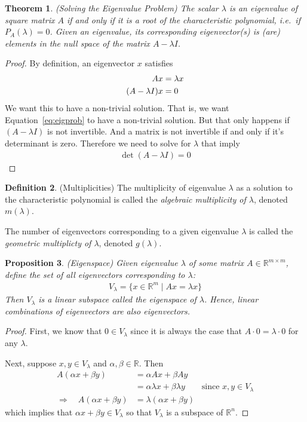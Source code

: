 \documentclass[12pt]{article}
\numberwithin{equation}{section} %
\theoremstyle{plain}
\newtheorem{thm}{Theorem}[section]
\newtheorem{prop}[thm]{Proposition}
\theoremstyle{definition}
\newtheorem{defn}[thm]{Definition}
\theoremstyle{remark}
\newcommand{\R}{\mathbb{R}}
\newcommand{\Rn}{\mathbb{R}^n}
\newcommand{\Rm}{\mathbb{R}^m}
\newcommand{\Rmm}{\mathbb{R}^{m\times m}}
\begin{document}
\begin{thm}\emph{(Solving the Eigenvalue Problem)}
The scalar $\lambda$ is an eigenvalue of square matrix $A$ if and only
if it is a root of the characteristic polynomial, i.e.\ if
$P_A(\lambda)=0$.  Given an eigenvalue, its corresponding eigenvector(s)
is (are) elements in the null space of the matrix $A-\lambda I$.
\end{thm}
\begin{proof}
By definition, an eigenvector $x$ satisfies
\begin{align}
  A x &= \lambda x\notag\\
  (A- \lambda I)x &= 0
  \label{eq:eigprob}
\end{align}
We want this to have a non-trivial solution. That is, we want
Equation~\ref{eq:eigprob} to have a non-trivial solution. But that only
happens if $(A-\lambda I)$ is not invertible. And a matrix is not
invertible if and only if it's determinant is zero. Therefore we need to
solve for $\lambda$ that imply
\begin{align*}
  \det(A-\lambda I)=0
\end{align*}
\end{proof}


\begin{defn}{(Multiplicities)}
The multiplicity of eigenvalue $\lambda$ as a solution to the
characteristic polynomial is called the \emph{algebraic multiplicity of
$\lambda$}, denoted $m(\lambda)$.

The number of eigenvectors corresponding to a given eigenvalue $\lambda$
is called the \emph{geometric multiplicty of $\lambda$}, denoted
$g(\lambda)$.
\end{defn}

\begin{prop}{\emph{(Eigenspace)}}
Given eigenvalue $\lambda$ of some matrix $A\in\Rmm$, define the set of
all eigenvectors corresponding to $\lambda$:
\begin{align*}
  V_\lambda = \{ x\in \Rm \; | \; Ax = \lambda x \}
\end{align*}
Then $V_\lambda$ is a linear subspace called the
\emph{eigenspace of $\lambda$}. Hence, linear combinations of
eigenvectors are also eigenvectors.
\end{prop}
\begin{proof}
First, we know that $0\in V_\lambda$ since it is always the case that
$A\cdot 0=\lambda \cdot 0$ for any $\lambda$.

Next, suppose $x,y \in V_\lambda$ and $\alpha,\beta\in\R$. Then
\begin{align*}
  A(\alpha x + \beta y)
  &= \alpha Ax + \beta Ay \\
  &= \alpha \lambda x + \beta \lambda y
  \qquad \text{since $x,y\in V_\lambda$} \\
  \Rightarrow\quad
  A(\alpha x + \beta y)
  &= \lambda (\alpha x + \beta y)
\end{align*}
which implies that $\alpha x + \beta y \in V_\lambda$ so that
$V_\lambda$ is a subspace of $\Rn$.
\end{proof}
\end{document}
